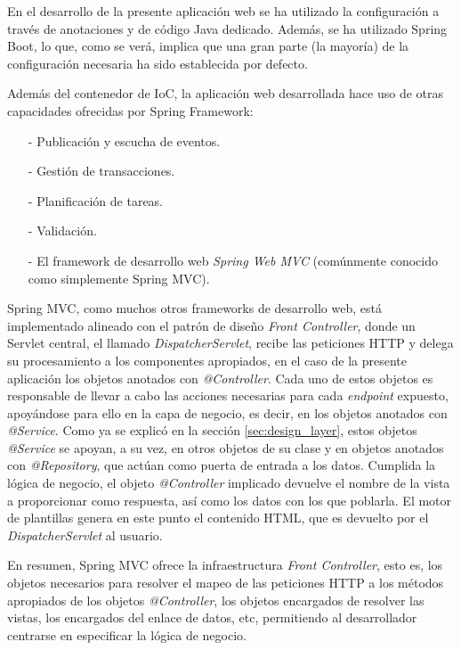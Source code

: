 \documentclass[a4paper,12pt,twoside,openright]{report}
\begin{document}
    En el desarrollo de la presente aplicación web se ha utilizado la configuración a través de anotaciones y de código Java dedicado. Además, se ha utilizado Spring Boot, lo que, como se verá, implica que una gran parte (la mayoría) de la configuración necesaria ha sido establecida por defecto.
    
    Además del contenedor de IoC, la aplicación web desarrollada hace uso de otras capacidades ofrecidas por Spring Framework:
    
    \begin{itemize}
    	\item[-] Publicación y escucha de eventos.
    	\item[-] Gestión de transacciones.
    	\item[-] Planificación de tareas.
    	\item[-] Validación.
    	\item[-] El framework de desarrollo web \emph{Spring Web MVC} (comúnmente conocido como simplemente Spring MVC).
    \end{itemize}
    
    Spring MVC, como muchos otros frameworks de desarrollo web, está implementado alineado con el patrón de diseño \emph{Front Controller}, donde un Servlet central, el llamado \emph{DispatcherServlet}, recibe las peticiones HTTP y delega su procesamiento a los componentes apropiados, en el caso de la presente aplicación los objetos anotados con \emph{@Controller}. Cada uno de estos objetos es responsable de llevar a cabo las acciones necesarias para cada \emph{endpoint} expuesto, apoyándose para ello en la capa de negocio, es decir, en los objetos anotados con \emph{@Service}. Como ya se explicó en la sección \ref{sec:design_layer}, estos objetos \emph{@Service} se apoyan, a su vez, en otros objetos de su clase y en objetos anotados con \emph{@Repository}, que actúan como puerta de entrada a los datos. Cumplida la lógica de negocio, el objeto \emph{@Controller} implicado devuelve el nombre de la vista a proporcionar como respuesta, así como los datos con los que poblarla. El motor de plantillas genera en este punto el contenido HTML, que es devuelto por el \emph{DispatcherServlet} al usuario.
    
    En resumen, Spring MVC ofrece la infraestructura \emph{Front Controller}, esto es, los objetos necesarios para resolver el mapeo de las peticiones HTTP a los métodos apropiados de los objetos \emph{@Controller}, los objetos encargados de resolver las vistas, los encargados del enlace de datos, etc, permitiendo al desarrollador centrarse en especificar la lógica de negocio.
    
\end{document}
